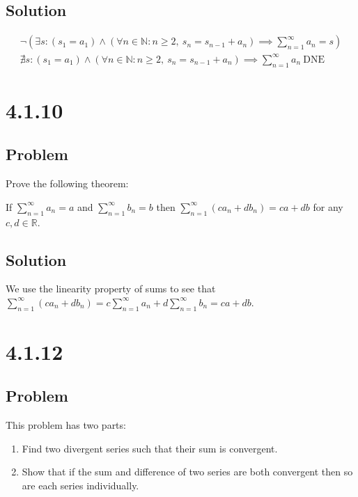 \documentclass[12pt]{article}
\newcommand{\round}[1]{\left(       #1 \right)      }
\newcommand{\R}    [0]{\mathbb{R}                   }
\newcommand{\N}    [0]{\mathbb{N}                   }
\begin{document}
\subsection*{Solution}
\begin{align*}
    \neg \round{\exists s : (s_1 = a_1) \wedge (\forall n \in \N : n \geq 2,\ s_n = s_{n-1} + a_n) \implies \sum_{n=1}^\infty a_n = s} \\
    \nexists s : (s_1 = a_1) \wedge (\forall n \in \N : n \geq 2,\ s_n = s_{n-1} + a_n) \implies \sum_{n=1}^\infty a_n \ \text{DNE}
\end{align*}



\section*{4.1.10}

\subsection*{Problem}
Prove the following theorem:

If $\sum_{n = 1}^\infty a_n = a$ and $\sum_{n = 1}^\infty b_n = b$ then $\sum_{n = 1}^\infty (c a_n + d b_n) = ca + db$ for any $c, d \in \R$.

\subsection*{Solution}
We use the linearity property of sums to see that $\sum_{n=1}^\infty (c a_n + d b_n) = c \sum_{n=1}^\infty a_n + d \sum_{n=1}^\infty b_n = ca + db$.



\section*{4.1.12}

\subsection*{Problem}
This problem has two parts:
\begin{enumerate}
    \item Find two divergent series such that their sum is convergent.
    \item Show that if the sum and difference of two series are both convergent then so are each series individually.
\end{enumerate}
\end{document}
